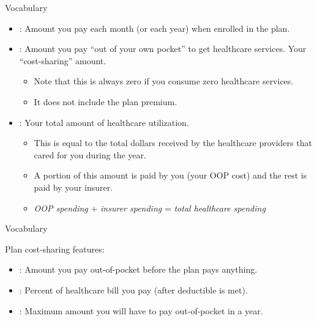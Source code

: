 \begin{frame}{Vocabulary}

    \begin{itemize}
        \item {}: Amount you pay each month (or each year) when enrolled in the plan.
        \pause
        \item {}: Amount you pay ``out of your own pocket'' to get healthcare services. Your ``cost-sharing'' amount.
        \begin{itemize}
            \item Note that this is always zero if you consume zero healthcare services.
            \item It does not include the plan premium.
        \end{itemize}
        \pause
    
        \item {}: Your total amount of healthcare utilization.
        \begin{itemize}
            \item This is equal to the total dollars received by the healthcare providers that cared for you during the year.
            \item A portion of this amount is paid by you (your OOP cost) and the rest is paid by your insurer.
            \item[$\rightarrow$] \emph{OOP spending} + \emph{insurer spending} = \emph{total healthcare spending}
        \end{itemize}
    \end{itemize}
    
\end{frame}
\begin{frame}{Vocabulary}

    Plan cost-sharing features:
    \begin{itemize}
        \item {}: Amount you pay out-of-pocket before the plan pays anything.
        \item {}: Percent of healthcare bill you pay (after deductible is met).
        \item {}: Maximum amount you will have to pay out-of-pocket in a year.
    \end{itemize}
    
\end{frame}

